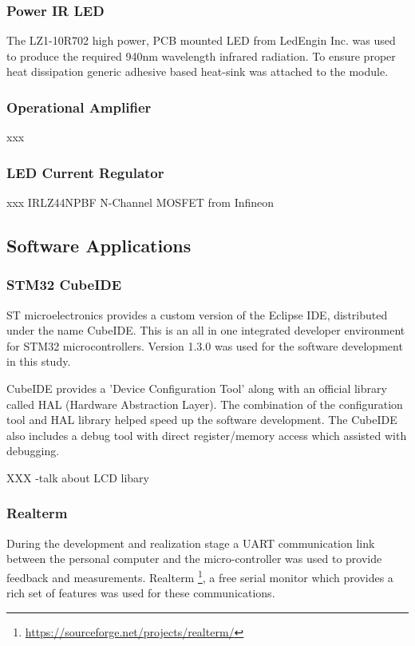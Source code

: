 \subsubsection{Power IR LED}

The LZ1-10R702 high power, PCB mounted LED from LedEngin Inc. was used to produce the required 940nm wavelength infrared radiation. To ensure proper heat dissipation generic adhesive based heat-sink was attached to the module.

\subsubsection{Operational Amplifier}
xxx

\subsubsection{LED Current Regulator}
xxx
IRLZ44NPBF N-Channel MOSFET from Infineon




\subsection{Software Applications}

\subsubsection{STM32 CubeIDE}
ST microelectronics provides a custom version of the Eclipse IDE, distributed under the name CubeIDE. This is an all in one integrated developer environment for STM32 microcontrollers. Version 1.3.0 was used for the software development in this study.

CubeIDE provides a 'Device Configuration Tool' along with an official library called HAL (Hardware Abstraction Layer). The combination of the configuration tool and HAL library helped speed up the software development. The CubeIDE also includes a debug tool with direct register/memory access which assisted with debugging.

XXX -talk about LCD libary

\subsubsection{Realterm}
During the development and realization stage a UART communication link between the personal computer and the micro-controller was used to provide feedback and measurements. Realterm \footnote{\url{https://sourceforge.net/projects/realterm/}}, a free serial monitor which provides a rich set of features was used for these communications.

